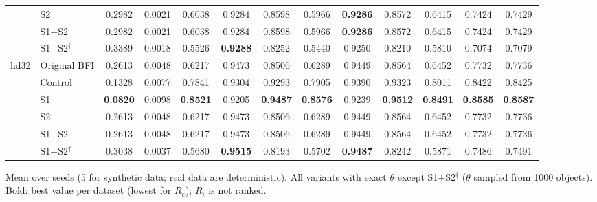 \begin{table}[!t]
\begin{tabular}{llccccccccccc}
 & S2 & 0.2982 & 0.0021 & 0.6038 & 0.9284 & 0.8598 & 0.5966 & \textbf{0.9286} & 0.8572 & 0.6415 & 0.7424 & 0.7429 \\
 & S1+S2 & 0.2982 & 0.0021 & 0.6038 & 0.9284 & 0.8598 & 0.5966 & \textbf{0.9286} & 0.8572 & 0.6415 & 0.7424 & 0.7429 \\
 & S1+S2$^{\dagger}$ & 0.3389 & 0.0018 & 0.5526 & \textbf{0.9288} & 0.8252 & 0.5440 & 0.9250 & 0.8210 & 0.5810 & 0.7074 & 0.7079 \\
\midrule
\multirow{6}{*}{hd32} & Original BFI & 0.2613 & 0.0048 & 0.6217 & 0.9473 & 0.8506 & 0.6289 & 0.9449 & 0.8564 & 0.6452 & 0.7732 & 0.7736 \\
 & Control & 0.1328 & 0.0077 & 0.7841 & 0.9304 & 0.9293 & 0.7905 & 0.9390 & 0.9323 & 0.8011 & 0.8422 & 0.8425 \\
 & S1 & \textbf{0.0820} & 0.0098 & \textbf{0.8521} & 0.9205 & \textbf{0.9487} & \textbf{0.8576} & 0.9239 & \textbf{0.9512} & \textbf{0.8491} & \textbf{0.8585} & \textbf{0.8587} \\
 & S2 & 0.2613 & 0.0048 & 0.6217 & 0.9473 & 0.8506 & 0.6289 & 0.9449 & 0.8564 & 0.6452 & 0.7732 & 0.7736 \\
 & S1+S2 & 0.2613 & 0.0048 & 0.6217 & 0.9473 & 0.8506 & 0.6289 & 0.9449 & 0.8564 & 0.6452 & 0.7732 & 0.7736 \\
 & S1+S2$^{\dagger}$ & 0.3038 & 0.0037 & 0.5680 & \textbf{0.9515} & 0.8193 & 0.5702 & \textbf{0.9487} & 0.8242 & 0.5871 & 0.7486 & 0.7491 \\
\bottomrule
\end{tabular}
\vspace{2pt}
\parbox{\textwidth}{\footnotesize Mean over seeds (5 for synthetic data; real data are deterministic). All variants with exact $\theta$ except S1+S2$^{\dagger}$ ($\theta$ sampled from 1000 objects). Bold: best value per dataset (lowest for $R_e$); $R_i$ is not ranked.}
\end{table}